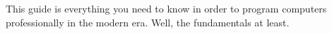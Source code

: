 

This guide is everything you need to know in order to program computers professionally in the modern era. Well, the fundamentals at least.



